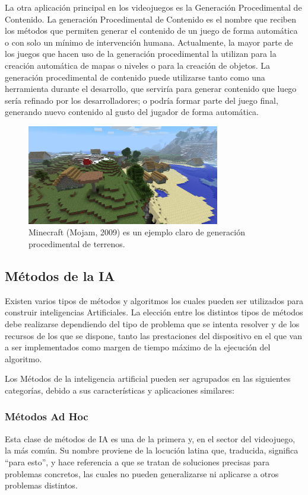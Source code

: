 La otra aplicación principal en los videojuegos es la Generación Procedimental de Contenido. La generación Procedimental de Contenido es el nombre que reciben los métodos que permiten generar el contenido de un juego de forma automática o con solo un mínimo de intervención humana. Actualmente, la mayor parte de los juegos que hacen uso de la generación procedimental la utilizan para la creación automática de mapas o niveles o para la creación de objetos. La generación procedimental de contenido puede utilizarse tanto como una herramienta durante el desarrollo, que serviría para generar contenido que luego sería refinado por los desarrolladores; o podría formar parte del juego final, generando nuevo contenido al gusto del jugador de forma automática.

\begin{figure}[h]
	\includegraphics[width=0.75\textwidth]{images/estadodelarte/ai/minecraft}
	\centering
	\caption{Minecraft (Mojam, 2009) es un ejemplo claro de generación procedimental de terrenos.}
\end{figure}

\subsection{Métodos de la IA}
Existen varios tipos de métodos y algoritmos los cuales pueden ser utilizados para construir inteligencias Artificiales. La elección entre los distintos tipos de métodos debe realizarse dependiendo del tipo de problema que se intenta resolver y de los recursos de los que se dispone, tanto las prestaciones del dispositivo en el que van a ser implementados como margen de tiempo máximo de la ejecución del algoritmo\cite{ai_and_games}. 

Los Métodos de la inteligencia artificial pueden ser agrupados en las siguientes categorías, debido a sus características y aplicaciones similares:

\subsubsection{Métodos Ad Hoc}
Esta clase de métodos de IA es una de la primera y, en el sector del videojuego, la más común. Su nombre proviene de la locución latina que, traducida, significa ``para esto'', y hace referencia a que se tratan de soluciones precisas para problemas concretos, las cuales no pueden generalizarse ni aplicarse a otros problemas distintos\cite{ai_and_games}.

